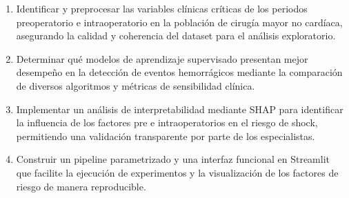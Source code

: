 \begin{enumerate}[label=\alph*)]
    \item Identificar y preprocesar las variables clínicas críticas de los periodos preoperatorio e intraoperatorio en la población de cirugía mayor no cardíaca, asegurando la calidad y coherencia del dataset para el análisis exploratorio.
    \item Determinar qué modelos de aprendizaje supervisado presentan mejor desempeño en la detección de eventos hemorrágicos mediante la comparación de diversos algoritmos y métricas de sensibilidad clínica.
    \item Implementar un análisis de interpretabilidad mediante SHAP para identificar la influencia de los factores pre e intraoperatorios en el riesgo de shock, permitiendo una validación transparente por parte de los especialistas.
    \item Construir un pipeline parametrizado y una interfaz funcional en Streamlit que facilite la ejecución de experimentos y la visualización de los factores de riesgo de manera reproducible.
\end{enumerate}

\newpage

